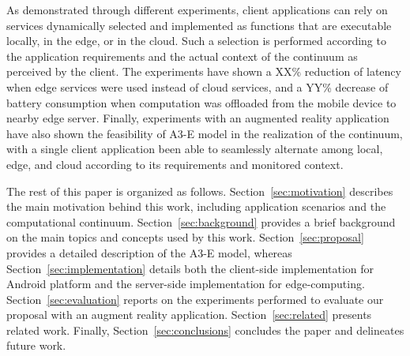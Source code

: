 As demonstrated through different experiments, client applications can rely on services dynamically selected and implemented as functions that are executable locally, in the edge, or in the cloud. Such a selection is performed according to the application requirements and the actual context of the continuum as perceived by the client. The experiments have shown a XX\% reduction of latency when edge services were used instead of cloud services, and a YY\% decrease of battery consumption when computation was offloaded from the mobile device to nearby edge server. Finally, experiments with an augmented reality application have also shown the feasibility of A3-E model in the realization of the continuum, with a single client application been able to seamlessly alternate among local, edge, and cloud according to its requirements and monitored context.




The rest of this paper is organized as follows. Section~\ref{sec:motivation} describes the main motivation behind this work, including application scenarios and the computational continuum. Section~\ref{sec:background} provides a brief background on the main topics and concepts used by this work. Section~\ref{sec:proposal} provides a detailed description of the A3-E model, whereas Section~\ref{sec:implementation} details both the client-side implementation for Android platform and the server-side implementation for edge-computing. Section~\ref{sec:evaluation} reports on the experiments performed to evaluate our proposal with an augment reality application. Section~\ref{sec:related} presents related work. Finally, Section~\ref{sec:conclusions} concludes the paper and delineates future work.




